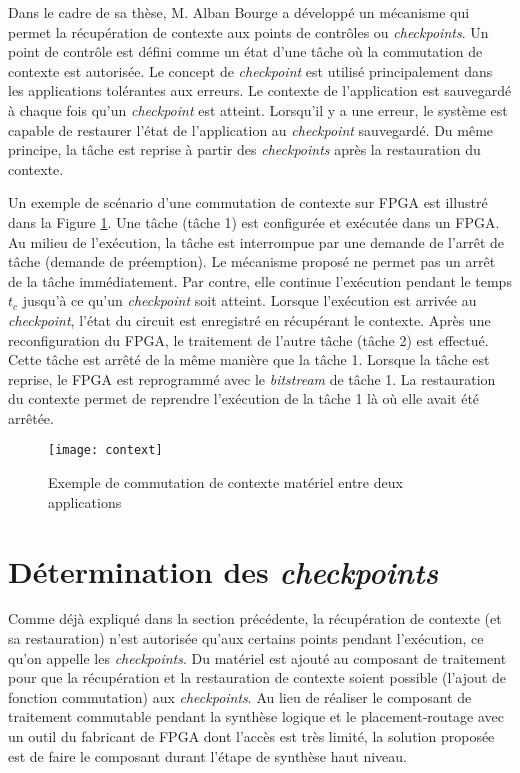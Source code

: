 Dans le cadre de sa thèse, M. Alban Bourge a développé un mécanisme qui permet 
la récupération de contexte aux points de contrôles ou \emph{checkpoints}.
Un point de contrôle est défini comme un état d'une tâche où la commutation de contexte est 
autorisée\cite{Bourge2015}. Le concept de \emph{checkpoint} est utilisé principalement 
dans les applications tolérantes aux erreurs. Le contexte
de l'application est sauvegardé à chaque fois qu'un \emph{checkpoint} est atteint. 
Lorsqu'il y a une erreur, le système est capable de restaurer
l'état de l'application au \emph{checkpoint} sauvegardé.
Du même principe, la tâche est reprise à partir des \emph{checkpoints} 
après la restauration du contexte.

Un exemple de scénario d'une commutation de contexte sur FPGA est illustré dans la Figure \ref{fig:switch}.
Une tâche (tâche 1) est configurée et exécutée dans un FPGA. Au milieu de l'exécution, la tâche est interrompue par
une demande de l'arrêt de tâche (demande de préemption).
Le mécanisme proposé ne permet pas un arrêt de la tâche immédiatement. Par contre, elle continue l'exécution pendant
le temps $t_c$ jusqu'à ce qu'un \emph{checkpoint} soit atteint. Lorsque l'exécution est arrivée au \emph{checkpoint},
l'état du circuit est enregistré en récupérant le contexte. Après une reconfiguration du FPGA, le traitement de l'autre tâche (tâche 2)
est effectué. Cette tâche est arrêté de la même manière que la tâche 1. Lorsque la tâche est reprise, le FPGA
est reprogrammé avec le \emph{bitstream} de tâche 1. La restauration du contexte permet de reprendre l'exécution
de la tâche 1 là où elle avait été arrêtée.

\begin{figure}[h]
	\centering
	\texttt{[image: context]}
	\caption{Exemple de commutation de contexte matériel entre deux applications\cite{Bourge2015}}
	\label{fig:switch}
	\vspace{-2mm}
\end{figure}

\section{Détermination des \emph{checkpoints}}

Comme déjà expliqué dans la section précédente, la récupération
de contexte (et sa restauration) n'est autorisée qu'aux certains points pendant l'exécution, ce qu'on
appelle les \emph{checkpoints}. Du matériel est ajouté au composant de traitement
pour que la récupération et la restauration de contexte soient possible (l'ajout de fonction
commutation) aux \emph{checkpoints}. Au lieu de réaliser le composant de traitement commutable pendant la synthèse logique et
le placement-routage avec un outil du fabricant de FPGA dont l'accès est très limité, 
la solution proposée est de faire le composant durant l'étape de synthèse haut niveau\cite{Bourge2015}.


